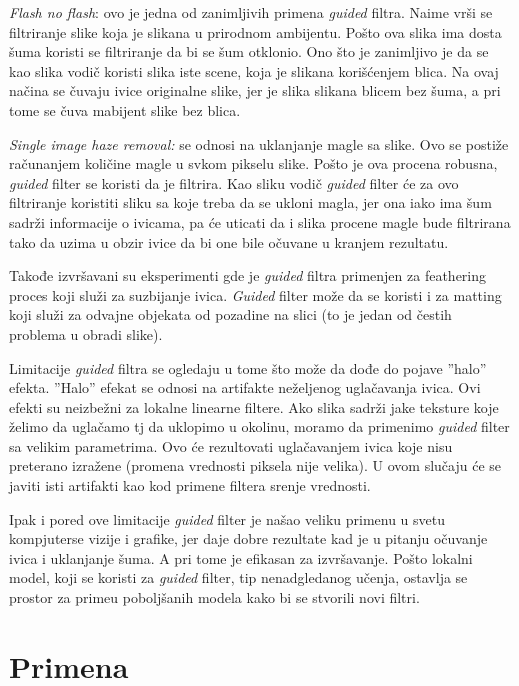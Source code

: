 \documentclass[a4paper,12pt,titlepage]{article}
\begin{document}
\emph{Flash no flash}: ovo je jedna od zanimljivih primena \emph{guided} filtra. Naime vrši se filtriranje slike koja je slikana u prirodnom ambijentu. Pošto ova slika ima dosta šuma koristi se filtriranje da bi se šum otklonio. Ono što je zanimljivo je da se kao slika vodič koristi slika iste scene, koja je slikana korišćenjem blica. Na ovaj načina se čuvaju ivice originalne slike, jer je slika slikana blicem bez šuma, a pri tome se čuva mabijent slike bez blica.

\emph{Single image haze removal:} se odnosi na uklanjanje magle sa slike. Ovo se postiže računanjem količine magle u svkom pikselu slike. Pošto je ova procena robusna, \emph{guided} filter se koristi da je filtrira. Kao sliku vodič \emph{guided} filter će za ovo filtriranje koristiti sliku sa koje treba da se ukloni magla, jer ona iako ima šum sadrži informacije o ivicama, pa će uticati da i slika procene magle bude filtrirana tako da uzima u obzir ivice da bi one bile očuvane u kranjem rezultatu.

Takođe izvršavani su eksperimenti gde je \emph{guided} filtra primenjen za feathering proces koji služi za suzbijanje ivica. \emph{Guided} filter može da se koristi i za matting koji služi za odvajne objekata od pozadine na slici (to je jedan od čestih problema u obradi slike).  

Limitacije \emph{guided} filtra se ogledaju u tome što može da dođe do pojave ''halo'' efekta. ''Halo'' efekat se odnosi na artifakte neželjenog uglačavanja ivica. Ovi efekti su neizbežni za lokalne linearne filtere. Ako slika sadrži jake teksture koje želimo da uglačamo tj da uklopimo u okolinu, moramo da primenimo \emph{guided} filter sa velikim parametrima. Ovo će rezultovati uglačavanjem ivica koje nisu preterano izražene (promena vrednosti piksela nije velika). U ovom slučaju će se javiti isti artifakti kao kod primene filtera srenje vrednosti.

Ipak i pored ove limitacije \emph{guided} filter je našao veliku primenu u svetu kompjuterse vizije i grafike, jer daje dobre rezultate kad je u pitanju očuvanje ivica i uklanjanje šuma. A pri tome je efikasan za izvršavanje. Pošto lokalni model, koji se koristi za \emph{guided} filter, tip nenadgledanog učenja, ostavlja se prostor za primeu poboljšanih modela kako bi se stvorili novi filtri.  

\section{Primena}%
\end{document}
